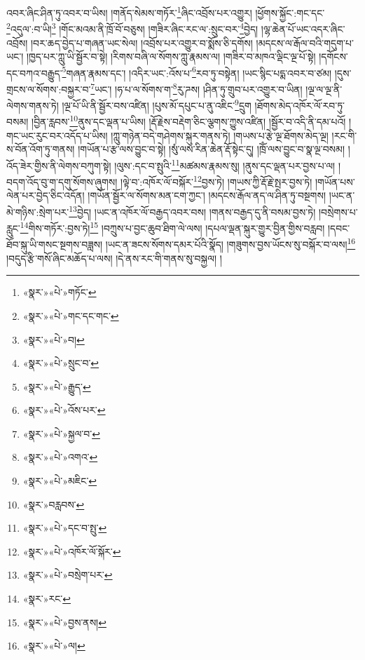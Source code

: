 འབར་ཞིང་ཤིན་ཏུ་འབར་བ་ཡིས། །གནོད་སེམས་གཏོར་\footnote{«སྣར་»«པེ་»གཏོང་}ཞིང་འབྲོས་པར་འགྱུར། །ཕྱོགས་སྐྱོང་:གང་དང་\footnote{«སྣར་»«པེ་»གང་དང་གང་}འདུལ་:བ་ཡི།\footnote{«སྣར་»«པེ་»བ།} །གོང་མའམ་ནི་ཁྲོ་བོ་བཅུས། །གཟིར་ཞིང་རང་ལ་:སྲུང་བར་\footnote{«སྣར་»«པེ་»སྲུང་བ་}བྱེད། །ལྷ་ཆེན་པོ་ཡང་འདར་ཞིང་འབྲོས། །བར་ཆད་བྱེད་པ་གཞན་ཡང་སེལ། །འབྲོས་པར་འགྱུར་བ་སྨོས་ཅི་དགོས། །མདངས་ལ་རྒོལ་བའི་གདུག་པ་ཡང་། །ཁྱད་པར་ཀླུ་ཡི་སྦྱོར་བ་སྟེ། །རིགས་བཞི་ལ་སོགས་ཀླུ་རྣམས་ལ། །གཟིར་བ་མཁའ་ལྡིང་ལྔ་པོ་སྟེ། །དགོངས་དང་བཀའ་བརྒྱུད་\footnote{«སྣར་»«པེ་»རྒྱུད་}གཞན་རྣམས་དང་། །འདིར་ཡང་:འོས་པ་\footnote{«སྣར་»«པེ་»འོས་པར་}རབ་ཏུ་བསྟེན། །ཡང་སྙིང་པདྨ་འབར་བ་ཙམ། །དུས་གྲངས་ལ་སོགས་:བསྐྱར་བ་\footnote{«སྣར་»«པེ་»སྐྱལ་བ་}ཡང་། །ཧ་པ་ལ་སོགས་ག་\footnote{«སྣར་»«པེ་»འགའ་}རུ་ཌས། །ཤིན་ཏུ་གྲུབ་པར་འགྱུར་བ་ཡིན། །ལྔ་ལ་ལྔ་ནི་ལེགས་གནས་ཏེ། །ལྔ་པོ་ཡི་ནི་སྦྱོར་བས་འཛིན། །པུས་མོ་དཔུང་པ་ནུ་འཇིང་\footnote{«སྣར་»«པེ་»མཇིང་}དྲུག །ཐོགས་མེད་འཁོར་ལོ་རབ་ཏུ་བསམ། །བྱིན་རླབས་\footnote{«སྣར་»བརླབས་}ནུས་དང་ལྡན་པ་ཡིས། །རྡོ་རྗེས་བརྡེག་ཅིང་ལྕགས་ཀྱུས་འཛིན། །སྦྱོར་བ་འདི་ནི་དམ་པའོ། །གང་ཡང་རུང་བར་འདོད་པ་ཡིས། །ཀླུ་གཉེན་བདེ་གཤེགས་སྐུར་གནས་ཏེ། །གཡས་པ་རྩེ་ལྔ་ཐོགས་མེད་ལྔ། །རང་གི་ས་བོན་འོག་ཏུ་གནས། །གཡོན་པ་རྩ་ལས་བྱུང་བ་སྟེ། །སུཾ་ལས་རིན་ཆེན་རྡོ་སྟེང་དུ། །ཁྲོཾ་ལས་བྱུང་བ་སྣ་ལྔ་བསམ། །འོད་ཟེར་གྱིས་ནི་ལེགས་བཀུག་སྟེ། །ལུས་:དང་བ་སྤུའི་\footnote{«སྣར་»«པེ་»དང་བ་སྤུ་}མཚམས་རྣམས་སུ། །ནུས་དང་ལྡན་པར་བྱས་པ་ལ། །བདག་འོད་བུ་ག་དགུ་སོགས་ཞུགས། །ལྟེ་བ་:འཁོར་ལོ་བསྐོར་\footnote{«སྣར་»«པེ་»འཁོར་ལོ་སྐོར་}བྱས་ཏེ། །གཡས་ཀྱི་རྡོ་རྗེ་སྤར་བྱས་ཏེ། །གཡོན་པས་ལེན་པར་བྱེད་ཅིང་འདོན། །གཡོན་སྦྱོར་ལ་སོགས་མན་ངག་ཀྱང་། །མདངས་རྒོལ་ནད་ལ་ཤིན་ཏུ་བསྔགས། །ཡང་ན་མེ་གཉིས་:སྲེག་པར་\footnote{«སྣར་»«པེ་»བསྲེག་པར་}བྱེད། །ཡང་ན་འཁོར་ལོ་བརྒྱད་འབར་བས། །གནས་བརྒྱད་དུ་ནི་བསམ་བྱས་ཏེ། །བསྲེགས་པ་རླུང་\footnote{«སྣར་»རང་}གིས་གཏོར་:བྱས་ཏེ།\footnote{«སྣར་»«པེ་»བྱས་ནས།} །བཀྲུས་པ་བྱང་ཆུབ་ཐིག་ལེ་ལས། །དཔལ་ལྡན་སྐུར་གྱུར་བྱིན་གྱིས་བརླབ། །དབང་ཐོབ་སྐུ་ཡི་གསང་སྔགས་བཟླས། །ཡང་ན་ཟངས་སོགས་དམར་པོའི་སྣོད། །གཟུགས་བྱས་ཡོངས་སུ་བསྐོར་བ་ལས།\footnote{«སྣར་»«པེ་»ལ།} །བདུད་རྩི་གསོ་ཞིང་མཆོད་པ་ལས། །དེ་ནས་རང་གི་གནས་སུ་བསྐྱལ། །
